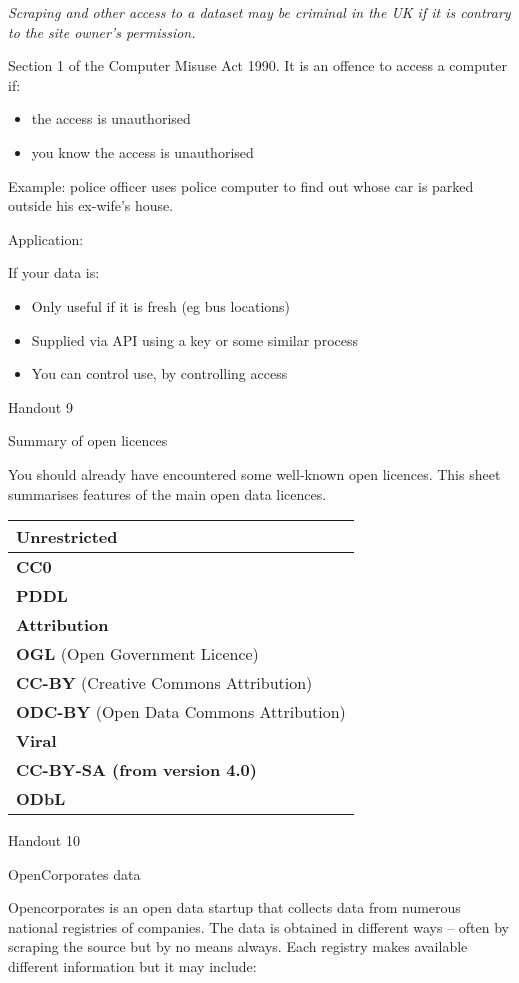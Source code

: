 \emph{Scraping and other access to a dataset may be criminal in the UK
if it is contrary to the site owner's permission.}

Section 1 of the Computer Misuse Act 1990. It is an offence to access a
computer if:

\begin{itemize}
\item
  the access is unauthorised
\item
  you know the access is unauthorised
\end{itemize}

Example: police officer uses police computer to find out whose car is
parked outside his ex-wife's house.

Application:

If your data is:

\begin{itemize}
\item
  Only useful if it is fresh (eg bus locations)
\item
  Supplied via API using a key or some similar process
\item
  You can control use, by controlling access
\end{itemize}

Handout 9

Summary of open licences

You should already have encountered some well-known open licences. This
sheet summarises features of the main open data licences.

\begin{longtable}[c]{@{}l@{}}
\toprule
\textbf{Unrestricted}\tabularnewline
\midrule
\endhead
\textbf{CC0}\tabularnewline
\textbf{PDDL}\tabularnewline
\textbf{Attribution}\tabularnewline
\textbf{OGL} (Open Government Licence)\tabularnewline
\textbf{CC-BY} (Creative Commons Attribution)\tabularnewline
\textbf{ODC-BY} (Open Data Commons Attribution)\tabularnewline
\textbf{Viral}\tabularnewline
\textbf{CC-BY-SA (from version 4.0)}\tabularnewline
\textbf{ODbL}\tabularnewline
\bottomrule
\end{longtable}

Handout 10

OpenCorporates data

Opencorporates is an open data startup that collects data from numerous
national registries of companies. The data is obtained in different ways
-- often by scraping the source but by no means always. Each registry
makes available different information but it may include:


